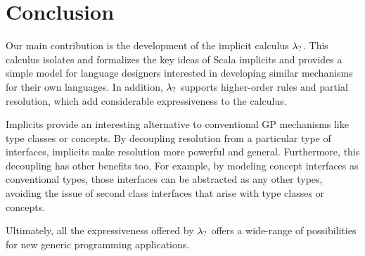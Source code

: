\section{Conclusion}
\label{sec:conclusion}

Our main contribution is the development of the implicit
calculus $\lambda_{?}$. This calculus isolates and formalizes the key
ideas of Scala implicits and provides a simple model for language designers 
interested in developing similar mechanisms for their own languages. 
In addition, $\lambda_{?}$ supports higher-order rules and partial resolution, 
which add considerable expressiveness to the calculus.

Implicits provide an interesting alternative to conventional GP 
mechanisms like type classes or concepts. By decoupling resolution 
from a particular type of interfaces, implicits make resolution 
more powerful and general. Furthermore, this decoupling has other benefits too. 
For example, by modeling concept interfaces as conventional types, those interfaces can 
be abstracted as any other types, avoiding the issue of second class interfaces 
that arise with type classes or concepts. 

Ultimately, all the expressiveness offered by $\lambda_{?}$
offers a wide-range of possibilities for new generic programming applications.

 





%
% 
% 


